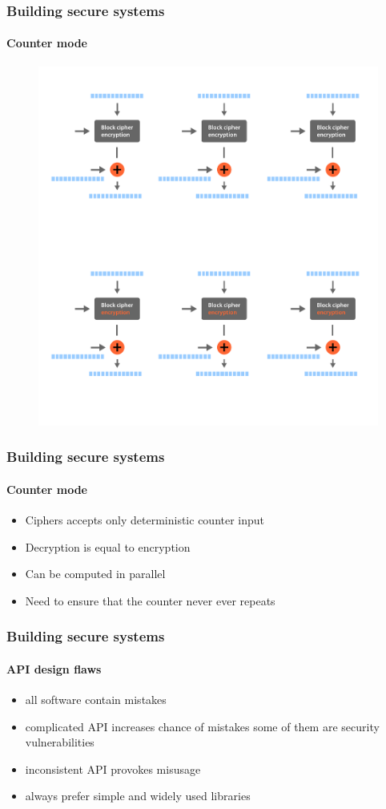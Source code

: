 \documentclass[11pt,t]{beamer}
\begin{document}
\begin{frame}[fragile]
\frametitle{Building secure systems}
\framesubtitle{Counter mode}
\begin{figure}[H]
\includegraphics[height=0.85\textheight]{ctr.pdf}
\end{figure}
\end{frame}

\begin{frame}
\frametitle{Building secure systems}
\framesubtitle{Counter mode}
\begin{itemize}
\item Ciphers accepts only deterministic counter input
\item Decryption is equal to encryption
\item Can be computed in parallel
\item Need to ensure that the counter never ever repeats
\end{itemize}
\end{frame}

\begin{frame}
\frametitle{Building secure systems}
\framesubtitle{API design flaws}
\begin{itemize}
\item<1-> all software contain mistakes
\item<2-> complicated API increases chance of mistakes some of them are security 
vulnerabilities
\item<3-> inconsistent API provokes misusage
\item<4-> always prefer simple and widely used libraries
\end{itemize}
\end{frame}
\end{document}
